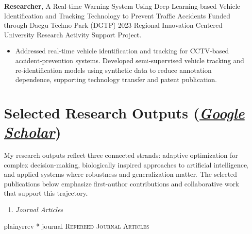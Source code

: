 \documentclass[11pt,a4paper,sans]{moderncv} %
\begin{document}
{\textbf{Researcher}, A Real-time Warning System Using Deep Learning-based Vehicle Identification and Tracking Technology to Prevent Traffic Accidents}
{}
{}
{}
{Funded through Daegu Techno Park (DGTP) 2023 Regional Innovation Centered University Research Activity Support Project.}
\begin{itemize}
   \vspace{-0.3cm}\item Addressed real-time vehicle identification and tracking for CCTV-based accident-prevention systems. Developed semi-supervised vehicle tracking and re-identification models using synthetic data to reduce annotation dependence, supporting technology transfer and patent publication.
\end{itemize}



\section{Selected Research Outputs ({\textcolor{theme1}{\href{https://scholar.google.com/citations?user=h_TVJTIAAAAJ&hl=en} {\textit{Google Scholar}}}})}

My research outputs reflect three connected strands: adaptive optimization for complex decision-making, biologically inspired approaches to artificial intelligence, and applied systems where robustness and generalization matter. The selected publications below emphasize first-author contributions and collaborative work that support this trajectory.


\begin{enumerate}[leftmargin=2.0cm, label=\Alph*.] 
    \item  \textcolor{theme2}{ \small{\textit{Journal Articles}} }
\end{enumerate}

{plainyrrev}
\nocite{journal}{*}
{journal}
{\large \textsc{Refereed Journal Articles}}

\end{document}
